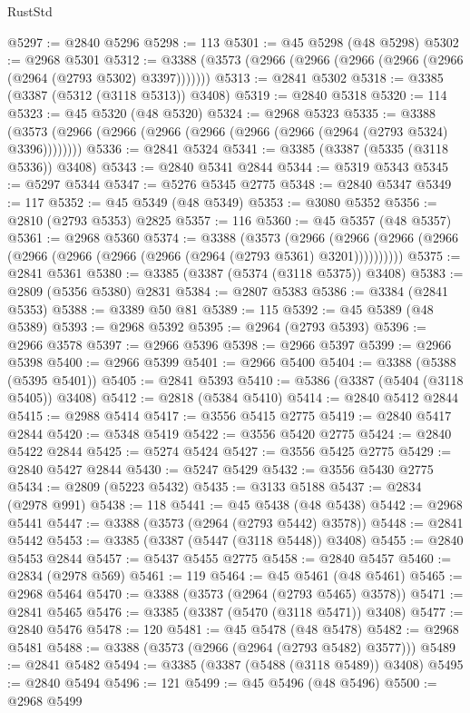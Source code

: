 \begin{lexlean}{RustStd}
\begin{coremodule}
{\begin{coremodule}
{{{{{{{{{{{{{{{{{{{{{{{{{{{{{{{{{@5297 := @2840 @5296
@5298 := 113
@5301 := @45 @5298 (@48 @5298)
@5302 := @2968 @5301
@5312 := @3388 (@3573 (@2966 (@2966 (@2966 (@2966 (@2966 (@2964 (@2793 @5302) @3397)))))))
@5313 := @2841 @5302
@5318 := @3385 (@3387 (@5312 (@3118 @5313)) @3408)
@5319 := @2840 @5318
@5320 := 114
@5323 := @45 @5320 (@48 @5320)
@5324 := @2968 @5323
@5335 := @3388 (@3573 (@2966 (@2966 (@2966 (@2966 (@2966 (@2966 (@2964 (@2793 @5324) @3396))))))))
@5336 := @2841 @5324
@5341 := @3385 (@3387 (@5335 (@3118 @5336)) @3408)
@5343 := @2840 @5341 @2844
@5344 := @5319 @5343
@5345 := @5297 @5344
@5347 := @5276 @5345 @2775
@5348 := @2840 @5347
@5349 := 117
@5352 := @45 @5349 (@48 @5349)
@5353 := @3080 @5352
@5356 := @2810 (@2793 @5353) @2825
@5357 := 116
@5360 := @45 @5357 (@48 @5357)
@5361 := @2968 @5360
@5374 := @3388
    (@3573
      (@2966 (@2966 (@2966 (@2966 (@2966 (@2966 (@2966 (@2966 (@2964 (@2793 @5361) @3201))))))))))
@5375 := @2841 @5361
@5380 := @3385 (@3387 (@5374 (@3118 @5375)) @3408)
@5383 := @2809 (@5356 @5380) @2831
@5384 := @2807 @5383
@5386 := @3384 (@2841 @5353)
@5388 := @3389 @50 @81
@5389 := 115
@5392 := @45 @5389 (@48 @5389)
@5393 := @2968 @5392
@5395 := @2964 (@2793 @5393)
@5396 := @2966 @3578
@5397 := @2966 @5396
@5398 := @2966 @5397
@5399 := @2966 @5398
@5400 := @2966 @5399
@5401 := @2966 @5400
@5404 := @3388 (@5388 (@5395 @5401))
@5405 := @2841 @5393
@5410 := @5386 (@3387 (@5404 (@3118 @5405)) @3408)
@5412 := @2818 (@5384 @5410)
@5414 := @2840 @5412 @2844
@5415 := @2988 @5414
@5417 := @3556 @5415 @2775
@5419 := @2840 @5417 @2844
@5420 := @5348 @5419
@5422 := @3556 @5420 @2775
@5424 := @2840 @5422 @2844
@5425 := @5274 @5424
@5427 := @3556 @5425 @2775
@5429 := @2840 @5427 @2844
@5430 := @5247 @5429
@5432 := @3556 @5430 @2775
@5434 := @2809 (@5223 @5432)
@5435 := @3133 @5188
@5437 := @2834 (@2978 @991)
@5438 := 118
@5441 := @45 @5438 (@48 @5438)
@5442 := @2968 @5441
@5447 := @3388 (@3573 (@2964 (@2793 @5442) @3578))
@5448 := @2841 @5442
@5453 := @3385 (@3387 (@5447 (@3118 @5448)) @3408)
@5455 := @2840 @5453 @2844
@5457 := @5437 @5455 @2775
@5458 := @2840 @5457
@5460 := @2834 (@2978 @569)
@5461 := 119
@5464 := @45 @5461 (@48 @5461)
@5465 := @2968 @5464
@5470 := @3388 (@3573 (@2964 (@2793 @5465) @3578))
@5471 := @2841 @5465
@5476 := @3385 (@3387 (@5470 (@3118 @5471)) @3408)
@5477 := @2840 @5476
@5478 := 120
@5481 := @45 @5478 (@48 @5478)
@5482 := @2968 @5481
@5488 := @3388 (@3573 (@2966 (@2964 (@2793 @5482) @3577)))
@5489 := @2841 @5482
@5494 := @3385 (@3387 (@5488 (@3118 @5489)) @3408)
@5495 := @2840 @5494
@5496 := 121
@5499 := @45 @5496 (@48 @5496)
@5500 := @2968 @5499
}}}}}}}}}}}}}}}}}}}}}}}}}}}}}}}}}
\end{coremodule}}
\end{coremodule}
\end{lexlean}
